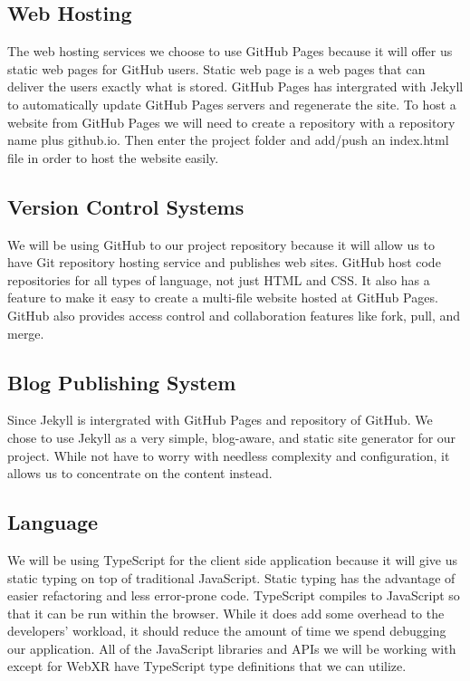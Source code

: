 \documentclass[onecolumn, draftclsnofoot,10pt, compsoc]{IEEEtran}
\begin{document}
\subsection{Web Hosting}
The web hosting services we choose to use GitHub Pages because it will offer us static web pages for GitHub users. Static web page is a web pages that can deliver the users exactly what is stored. GitHub Pages has intergrated with Jekyll to automatically update GitHub Pages servers and regenerate the site. To host a website from GitHub Pages we will need to create a repository with a repository name plus github.io. Then enter the project folder and add/push an index.html file in order to host the website easily.  

\subsection{Version Control Systems}
We will be using GitHub to our project repository because it will allow us to have Git repository hosting service and publishes web sites. GitHub host code repositories for all types of language, not just HTML and CSS. It also has a feature to make it easy to create a multi-file website hosted at GitHub Pages. GitHub also provides access control and collaboration features like fork, pull, and merge.  

\subsection{Blog Publishing System}
Since Jekyll is intergrated with GitHub Pages and repository of GitHub. We chose to use Jekyll as a very simple, blog-aware, and static site generator for our project. While not have to worry with needless complexity and configuration, it allows us to concentrate on the content instead. 

\subsection{Language}
We will be using TypeScript for the client side application because it will give us static typing on top of traditional JavaScript. Static typing has the advantage of easier refactoring and less error-prone code. TypeScript compiles to JavaScript so that it can be run within the browser. While it does add some overhead to the developers' workload, it should reduce the amount of time we spend debugging our application. All of the JavaScript libraries and APIs we will be working with except for WebXR have TypeScript type definitions that we can utilize. 
\end{document}
